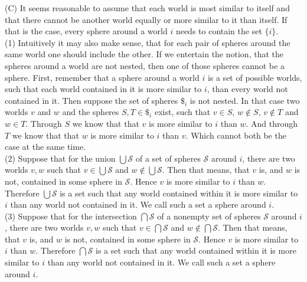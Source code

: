 \documentclass[a4paper,american]{paper}
\theoremstyle{definition}\newtheorem{definition}{Definition}
\begin{document}
(C) It seems reasonable to assume that each world is most similar to itself and that there cannot be another world equally or more similar to it than itself. If that is the case, every sphere around a world $i$ needs to contain the set $\{ i\}$.\\
\indent (1) Intuitively it may also make sense, that for each pair of spheres around the same world one should include the other. If we entertain the notion, that the spheres around a world are not nested, then one of those spheres cannot be a sphere. First, remember that a sphere around a world $i$ is a set of possible worlds, such that each world contained in it is more similar to $i$, than every world not contained in it. Then suppose the set of spheres $\$_i$ is not nested. In that case two worlds $v$ and $w$ and the spheres $S,T\in\$_i$ exist, such that $v\in S$, $w\notin S$, $v\notin T$ and $w\in T$. Through $S$ we know that that $v$ is more similar to $i$ than $w$. And through $T$ we know that that $w$ is more similar to $i$ than $v$. Which cannot both be the case at the same time.\\
\indent (2) Suppose that for the union $\bigcup\mathscr{S}$ of a set of spheres $\mathscr{S}$ around $i$, there are two worlds $v,w$ such that $v\in\bigcup\mathscr{S}$ and $w\notin\bigcup\mathscr{S}$. Then that means, that $v$ is, and $w$ is not, contained in some sphere in $\mathscr{S}$. Hence $v$ is more similar to $i$ than $w$. Therefore $\bigcup\mathscr{S}$ is a set such that any world contained within it is more similar to $i$ than any world not contained in it. We call such a set a sphere around $i$.\\
\indent (3) Suppose that for the intersection $\bigcap\mathscr{S}$ of a nonempty set of spheres $\mathscr{S}$ around $i$, there are two worlds $v,w$ such that $v\in\bigcap\mathscr{S}$ and $w\notin\bigcap\mathscr{S}$. Then that means, that $v$ is, and $w$ is not, contained in some sphere in $\mathscr{S}$. Hence $v$ is more similar to $i$ than $w$. Therefore $\bigcap\mathscr{S}$ is a set such that any world contained within it is more similar to $i$ than any world not contained in it. We call such a set a sphere around $i$.
\end{document}
